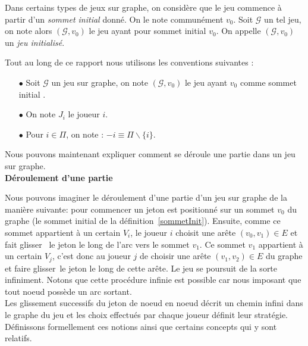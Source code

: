 \begin{defi}\label{sommetInit}
	Dans certains types de jeux sur graphe, on considère que le jeu commence à partir d'un \textit{sommet initial} donné. On le note communément $v_{0}$. Soit $\mathcal{G}$ un tel jeu, on note alors $(\mathcal{G},v_{0})$ le jeu ayant pour sommet initial $v_{0}$. On appelle $(\mathcal{G},v_{0})$ un \textit{jeu initialisé}.
\end{defi}

\begin{notations}
	Tout au long de ce rapport nous utilisons les conventions suivantes :
	\begin{enumerate}
		\item[$\bullet$] Soit $\mathcal{G}$ un jeu sur graphe, on note $(\mathcal{G},v_{0})$ le jeu ayant $v_{0}$ comme sommet initial .
		
		\item[$\bullet$] On note $J_{i}$  le joueur $i$.
		
		\item[$\bullet$] Pour $i\in \Pi$, on note : $-i\equiv \Pi\backslash \{ i\} $.
	\end{enumerate}
\end{notations}

Nous pouvons maintenant expliquer comment se déroule une partie dans un jeu sur graphe.\\



\noindent\textbf{Déroulement d'une partie}\label{derPar}

Nous pouvons imaginer le déroulement d'une partie d'un jeu sur graphe de la manière suivante: pour commencer un jeton est positionné sur un sommet $v_{0}$ du graphe (le sommet initial de la définition~\ref{sommetInit}). Ensuite, comme ce sommet appartient à un certain $V_{i}$, le joueur $i$ choisit une arête $(v_{0},v_{1}) \in E$ et fait \og glisser \fg~le jeton le long de l'arc vers le sommet $v_{1}$. Ce sommet $v_{1}$ appartient à un certain $V_{j}$, c'est donc au joueur $j$ de choisir une arête $(v_{1},v_{2})\in E$ du graphe et faire \og glisser\fg~le jeton le long de cette arête. Le jeu se poursuit de la sorte infiniment. Notons que cette procédure infinie est possible car nous imposant que tout noeud possède un arc sortant. \\

Les glissement successifs du jeton de noeud en noeud décrit un chemin infini dans le graphe du jeu et les choix effectués par chaque joueur  définit leur stratégie. Définissons formellement ces notions ainsi que certains concepts qui y sont relatifs.


